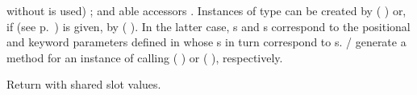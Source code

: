 \begin{LIST}{1cm}
{  without  is used)
  ; and able accessors
  \LIT{-}. Instances of type  can be
  created by ( ) or, if  (see
  p.\ \pageref{section:Functions}) is given, by (
   ). In the latter
  case, s and \kwd{:}s correspond to the positional
  and keyword parameters defined in  whose s
  in turn correspond to s.
  / generate a
   method for an instance  of 
  calling (  ) or (
    ), respectively.
  }

  {
  Return  with shared slot values.
  }

\end{LIST}


